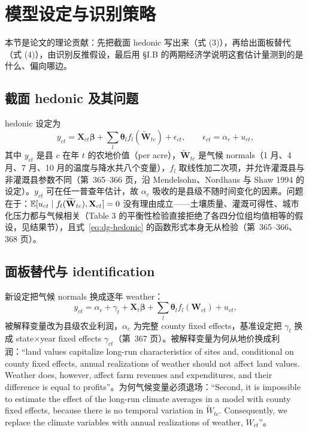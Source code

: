 \section{模型设定与识别策略}

本节是论文的理论贡献：先把截面 hedonic 写出来（式 (3)），再给出面板替代（式 (4)），由识别反推假设，最后用 \S I.B 的两期经济学说明这套估计量测到的是什么、偏向哪边。

\subsection{截面 hedonic 及其问题}

hedonic 设定为
\begin{equation}
y_{ct} = \mathbf{X}_{ct}\boldsymbol{\beta} + \sum_l \boldsymbol{\theta}_l f_l(\widetilde{\mathbf{W}}_{tc}) + \epsilon_{ct},
\qquad \epsilon_{ct} = \alpha_c + u_{ct},
\label{eq:dg-hedonic}
\end{equation}
其中 $y_{ct}$ 是县 $c$ 在年 $t$ 的农地价值（per acre），$\widetilde{\mathbf{W}}_{tc}$ 是气候 normals（1 月、4 月、7 月、10 月的温度与降水共八个变量），$f_l$ 取线性加二次项，并允许灌溉县与非灌溉县参数不同（第~365--366 页，沿 Mendelsohn、Nordhaus 与 Shaw 1994 的设定）。$y_{ct}$ 可在任一普查年估计，故 $\alpha_c$ 吸收的是县级不随时间变化的因素。问题在于：$\mathbb{E}[u_{ct} \mid f_l(\widetilde{\mathbf{W}}_{tc}), \mathbf{X}_{ct}] = 0$ 没有理由成立——土壤质量、灌溉可得性、城市化压力都与气候相关（Table 3 的平衡性检验直接拒绝了各四分位组均值相等的假设，见结果节），且式~\ref{eq:dg-hedonic} 的函数形式本身无从检验（第~365--366、368 页）。

\subsection{面板替代与 identification}

新设定把气候 normals 换成逐年 weather：
\begin{equation}
y_{ct} = \alpha_c + \gamma_t + \mathbf{X}_t\boldsymbol{\beta} + \sum_l \boldsymbol{\theta}_l f_l(\mathbf{W}_{ct}) + u_{ct},
\label{eq:dg-panel}
\end{equation}
被解释变量改为县级农业利润，$\alpha_c$ 为完整 county fixed effects，基准设定把 $\gamma_t$ 换成 state$\times$year fixed effects $\gamma_{ct}$（第~367 页）。被解释变量为何从地价换成利润：``land values capitalize long-run characteristics of sites and, conditional on county fixed effects, annual realizations of weather should not affect land values. Weather does, however, affect farm revenues and expenditures, and their difference is equal to profits''\citep[第~367 页]{deschenes2007economic}。为何气候变量必须退场：``Second, it is impossible to estimate the effect of the long-run climate averages in a model with county fixed effects, because there is no temporal variation in $\widetilde{W}_{tc}$. Consequently, we replace the climate variables with annual realizations of weather, $W_{ct}$''\citep[第~367 页；$\widetilde{W}_{tc}$ 即气候 normals]{deschenes2007economic}。

